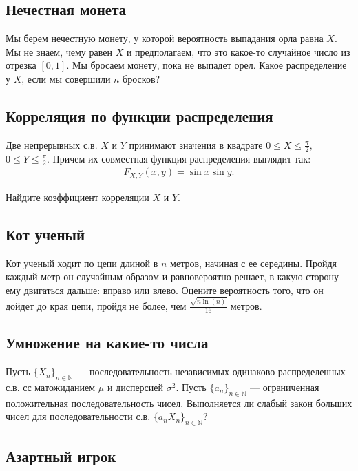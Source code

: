 \documentclass[12pt]{article}
\newcommand\N{\mathbb{N}}
\begin{document}
\subsection{Нечестная монета}

Мы берем нечестную монету, у которой вероятность выпадания орла равна $X$. Мы не знаем, чему равен $X$ и предполагаем, что это какое-то случайное число из отрезка $[0, 1]$. Мы бросаем монету, пока не выпадет орел. Какое распределение у $X$, если мы совершили $n$ бросков?



\subsection{Корреляция по функции распределения}

Две непрерывных с.в. $X$ и $Y$ принимают значения в квадрате $0 \le X \le \frac{\pi}{2},$ $0 \le Y \le \frac{\pi}{2}$. Причем их совместная функция распределения выглядит так:
\begin{align*}
    F_{X, Y} (x, y) = \sin x \sin y.
\end{align*}

Найдите коэффициент корреляции $X$ и $Y$.



\subsection{Кот ученый}

Кот ученый ходит по цепи длиной в $n$ метров, начиная с ее середины. Пройдя каждый метр он случайным образом и равновероятно решает, в какую сторону ему двигаться дальше: вправо или влево. Оцените вероятность того, что он дойдет до края цепи, пройдя не более, чем $\frac{\sqrt{n \ln(n)}}{16}$ метров.



\subsection{Умножение на какие-то числа}

Пусть $\{X_n\}_{n \in \N}$ --- последовательность независимых одинаково распределенных с.в. сс матожиданием $\mu$ и дисперсией $\sigma^2$. Пусть $\{a_n\}_{n \in \N}$ --- ограниченная положительная последовательность чисел. Выполняется ли слабый закон больших чисел для последовательности с.в. $\{a_n X_n\}_{n \in \N}$?



\subsection{Азартный игрок}
\end{document}
